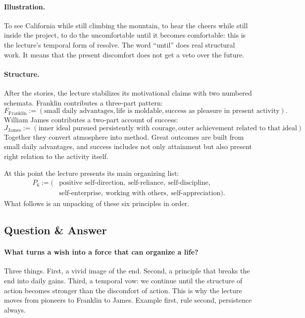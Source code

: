 \paragraph{Illustration.}
To see California while still climbing the mountain, to hear the cheers while still inside the project, to do the uncomfortable until it becomes comfortable: this is the lecture's temporal form of resolve. The word ``until'' does real structural work. It means that the present discomfort does not get a veto over the future.

\paragraph{Structure.}
After the stories, the lecture stabilizes its motivational claims with two numbered schemata. Franklin contributes a three-part pattern:
\begin{equation}
F_{\text{Franklin}} :=
(\text{small daily advantages},
\text{life is moldable},
\text{success as pleasure in present activity}).
\end{equation}
William James contributes a two-part account of success:
\begin{equation}
J_{\text{James}} :=
(\text{inner ideal pursued persistently with courage},
\text{outer achievement related to that ideal}).
\end{equation}
Together they convert atmosphere into method. Great outcomes are built from small daily advantages, and success includes not only attainment but also present right relation to the activity itself.

At this point the lecture presents its main organizing list:
\begin{align}
P_6 := (&\text{positive self-direction},\ \text{self-reliance},\ \text{self-discipline}, \nonumber\\
&\text{self-enterprise},\ \text{working with others},\ \text{self-appreciation}).
\end{align}
What follows is an unpacking of these six principles in order.

\subsection{Question \& Answer}

\paragraph{What turns a wish into a force that can organize a life?}
Three things. First, a vivid image of the end. Second, a principle that breaks the end into daily gains. Third, a temporal vow: we continue until the structure of action becomes stronger than the discomfort of action. This is why the lecture moves from pioneers to Franklin to James. Example first, rule second, persistence always.

